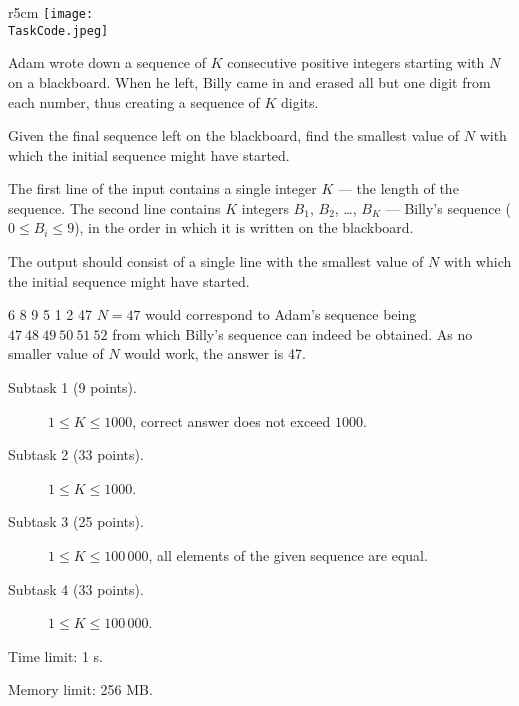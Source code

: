 \documentclass{boi2014}
\renewcommand{\TaskCode}{sequence}
\begin{document}
    \begin{wrapfigure}[5]{r}{5cm}
        \vspace{-24pt}
		\texttt{[image: \\TaskCode.jpeg]}
	\end{wrapfigure}

    Adam wrote down a sequence of $K$ consecutive positive integers starting
    with $N$ on a blackboard. When he left, Billy came in and erased all but one
    digit from each number, thus creating a sequence of $K$ digits.

    \Task

    Given the final sequence left on the blackboard, find the smallest
    value of $N$ with which the initial sequence might have started.

    \Input

    The first line of the input contains a single integer $K$ --- the length of
    the sequence. The second line contains $K$ integers $B_1$, $B_2$, \dots,
    $B_K$ --- Billy's sequence ($0 \le B_i \le 9$), in the order in which it is written on the
    blackboard.

    \Output

    The output should consist of a single line with the smallest value of
    $N$ with which the initial sequence might have started.

    \Example

    \example
    {
        6 8 9 5 1 2
    }
    {
        47
    }
    {
        $N = 47$ would correspond to Adam's sequence
        being $47\ 48\ 49\ 50\ 51\ 52$ from which Billy's sequence
        can indeed be obtained. As no smaller value of $N$
        would work, the answer is 47.
    }

\Scoring

\begin{description}
    \item[Subtask 1 (9 points).] $1 \le K \le 1000$, correct
        answer does not exceed $1000$.
    \item[Subtask 2 (33 points).] $1 \le K \le 1000$.
    \item[Subtask 3 (25 points).] $1 \le K \le 100\,000$, all
		elements of the given sequence are equal.
    \item[Subtask 4 (33 points).] $1 \le K \le 100\,000$.
\end{description}

\Constraints

Time limit: 1 s.

Memory limit: 256 MB.
\end{document}
